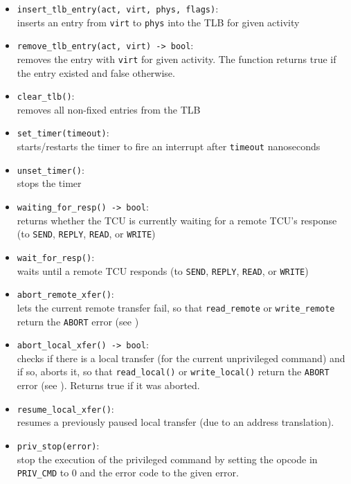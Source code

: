 \begin{itemize}
  \item \texttt{insert\_tlb\_entry(act, virt, phys, flags)}: \\
  inserts an entry from \texttt{virt} to \texttt{phys} into the TLB for given activity
  \item \texttt{remove\_tlb\_entry(act, virt) -> bool}:\\
  removes the entry with \texttt{virt} for given activity. The function returns true
  if the entry existed and false otherwise.
  \item \texttt{clear\_tlb()}:\\
  removes all non-fixed entries from the TLB \extend{}
  \item \texttt{set\_timer(timeout)}: \\
  starts/restarts the timer to fire an interrupt after \texttt{timeout} nanoseconds
  \item \texttt{unset\_timer()}:\\
  stops the timer
  \item \texttt{waiting\_for\_resp() -> bool}:\\
  returns whether the TCU is currently waiting for a remote TCU's response (to \texttt{SEND},
  \texttt{REPLY}, \texttt{READ}, or \texttt{WRITE})
  \item \texttt{wait\_for\_resp()}:\\
  waits until a remote TCU responds (to \texttt{SEND}, \texttt{REPLY}, \texttt{READ}, or
  \texttt{WRITE})
  \item \texttt{abort\_remote\_xfer()}:\\
  lets the current remote transfer fail, so that \texttt{read\_remote} or \texttt{write\_remote}
  return the \texttt{ABORT} error (see )
  \item \texttt{abort\_local\_xfer() -> bool}:\\
  checks if there is a local transfer (for the current unprivileged command) and if so, aborts it,
  so that \texttt{read\_local()} or \texttt{write\_local()} return the \texttt{ABORT} error (see
  ). Returns true if it was aborted.
  \item \texttt{resume\_local\_xfer()}:\\
  resumes a previously paused local transfer (due to an address translation). \extend{}
  \item \texttt{priv\_stop(error)}: \\
  stop the execution of the privileged command by setting the opcode in \texttt{PRIV\_CMD} to 0 and
  the error code to the given error. \extend{}
\end{itemize}

